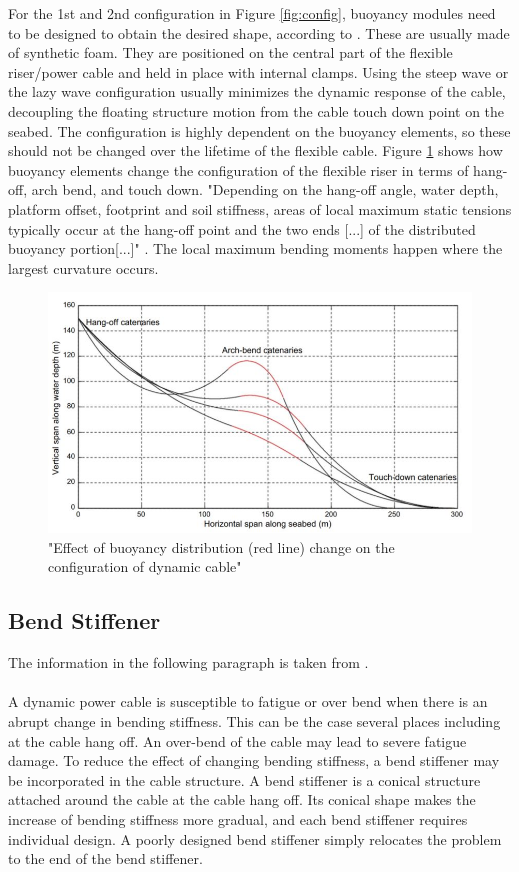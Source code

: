\noindent For the 1st and 2nd configuration in Figure \ref{fig:config}, buoyancy modules need to be designed to obtain the desired shape, according to \cite{srinil2016}. These are usually made of synthetic foam. They are positioned on the central part of the flexible riser/power cable and held in place with internal clamps. Using the steep wave or the lazy wave configuration usually minimizes the dynamic response of the cable,  decoupling the floating structure motion from the cable touch down point on the seabed. The configuration is highly dependent on the buoyancy elements, so these should not be changed over the lifetime of the flexible cable. Figure \ref{fig:bend} shows how buoyancy elements change the configuration of the flexible riser in terms of hang-off, arch bend, and touch down. "Depending on the hang-off angle, water depth, platform offset, footprint and soil stiffness, areas of local maximum static tensions typically occur at the hang-off point and
the two ends [...] of the distributed buoyancy portion[...]" \cite{srinil2016}. The local maximum bending moments happen where the largest curvature occurs.

\begin{figure}[H]
\centering
\includegraphics[scale=0.6]{figures/bend}
\caption[$\; \:$Effect of buoyancy distribution]{"Effect of buoyancy distribution (red line) change on the configuration of dynamic
cable" \cite{srinil2016}}
 \label{fig:bend}
\end{figure}
\subsection{Bend Stiffener}
The information in the following paragraph is taken from \cite{Worzyk}. \\\\
A dynamic power cable is susceptible to fatigue or over bend when there is an abrupt change in bending stiffness. This can be the case several places including at the cable hang off. An over-bend of the cable may lead to severe fatigue damage. To reduce the effect of changing bending stiffness, a bend stiffener may be incorporated in the cable structure. A bend stiffener is a conical structure attached around the cable at the cable hang off. Its conical shape makes the increase of bending stiffness more gradual, and each bend stiffener requires individual design. A poorly designed bend stiffener simply relocates the problem to the end of the bend stiffener.


